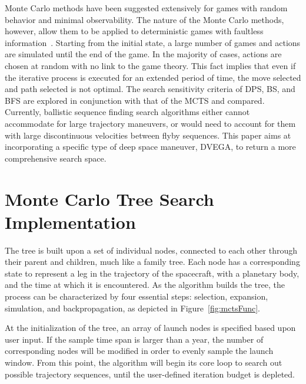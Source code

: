\documentclass[letterpaper, paper,11pt]{AAS}	%
\newcommand*\circled[1]{\tikz[baseline=(char.base)]{
            \node[shape=circle,draw,inner sep=0.8pt] (char) {#1};}}
\begin{document}
Monte Carlo methods have been suggested extensively for games with random behavior and minimal observability. The nature of the Monte Carlo methods, however, allow them to be applied to deterministic games with faultless information~\cite{Browne2012}. Starting from the initial state, a large number of games and actions are simulated until the end of the game. In the majority of cases, actions are chosen at random with no link to the game theory. This fact implies that even if the iterative process is executed for an extended period of time, the move selected and path selected is not optimal. The search sensitivity criteria of DPS, BS, and BFS are explored in conjunction with that of the MCTS and compared. Currently, ballistic sequence finding search algorithms either cannot accommodate for large trajectory maneuvers, or would need to account for them with large discontinuous velocities between flyby sequences. This paper aims at incorporating a specific type of deep space maneuver, DVEGA, to return a more comprehensive search space.

\section*{Monte Carlo Tree Search Implementation}

The tree is built upon a set of individual nodes, connected to each other through their parent and children, much like a family tree. Each node has a corresponding state to represent a leg in the trajectory of the spacecraft, with a planetary body, and the time at which it is encountered. As the algorithm builds the tree, the process can be characterized by four essential steps: \circled{1} selection,\hspace{1em} \circled{2} expansion, \circled{3} simulation, and \circled{4} backpropagation, as depicted in Figure~\ref*{fig:mctsFunc}.

At the initialization of the tree, an array of launch nodes is specified based upon user input. If the sample time span is larger than a year, the number of corresponding nodes will be modified in order to evenly sample the launch window. From this point, the algorithm will begin its core loop to search out possible trajectory sequences, until the user-defined iteration budget is depleted.
\end{document}
